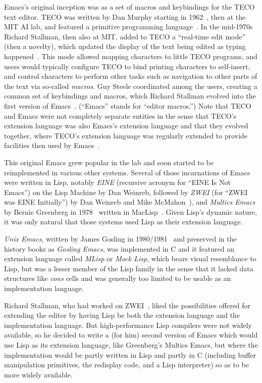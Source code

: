 \documentclass[format=acmsmall, review]{acmart}
\begin{document}
Emacs's original inception was as a set of macros and keybindings for the
TECO text editor.  TECO was written by Dan Murphy starting in
1962~\cite{Murphy09}, then at the MIT AI lab, and featured a primitive
programming language~\cite{Stallman2018-personal}.  In the mid-1970s Richard
Stallman, then also at MIT, added to TECO a ``real-time edit mode'' (then
a novelty), which updated the display of the text being edited as typing
happened~\cite{MulticsEmacs1996}.  This mode allowed mapping characters to little TECO programs, and
users would typically configure TECO to bind printing characters to
self-insert, and control characters to perform other tasks such as
navigation to other parts of the text via so-called \textit{macros}.  Guy Steele
coordinated among the users, creating a common set of keybindings and macros, which
Richard Stallman evolved into the first version of
Emacs~\cite{EmacsLore,Seibel2009}.  (``Emacs'' stands for ``editor macros.'')
Note that TECO and Emacs were not completely separate entities in the sense
that TECO's extension language was also Emacs's extension language and that
they evolved together, where TECO's extension language was regularly
extended to provide facilities then used by Emacs~\cite{Stallman2002}.

This original Emacs grew popular in the lab and soon started to be
reimplemented in various other systems.  Several of those incarnations of
Emacs were written in Lisp, notably \emph{EINE} (recursive acronym for
``EINE Is Not Emacs'') on the Lisp Machine by Dan Weinreb, followed by
\emph{ZWEI} (for ``ZWEI was EINE Initially'') by Dan Weinreb and Mike
McMahon~\cite{Weinreb1979}), and \emph{Multics Emacs} by Bernie Greenberg in
1978~\cite{MulticsEmacs1996,Stallman2002} written in MacLisp~\cite{Moon1974,Pitman1983}.
Given Lisp's dynamic nature, it was only natural that those systems used
Lisp as their extension language.

\emph{Unix Emacs}, written by James Gosling in 1980/1981~\cite{Gosling1981}
and preserved in the history books as \emph{Gosling Emacs},
was implemented in C and it featured an extension
language called \emph{MLisp} or \emph{Mock Lisp}, which bears visual
resemblance to Lisp, but was a lesser member of the Lisp family in the
sense that it lacked data structures like \emph{cons} cells and was
generally too limited to be usable as an implementation language.

Richard Stallman, who had worked on
ZWEI~\cite{Stallman2018-personal}, liked the possibilities offered for
extending the editor by having Lisp be both the extension language and the
implementation language.  But high-performance Lisp compilers were not
widely available, so he decided to write a (for him) second version of Emacs
which would use Lisp as its extension language, like Greenberg's Multics
Emacs, but where the implementation would be partly written in Lisp and
partly in C (including buffer manipulation primitives, the redisplay code,
and a Lisp interpreter) so as to be more widely available.
\end{document}
